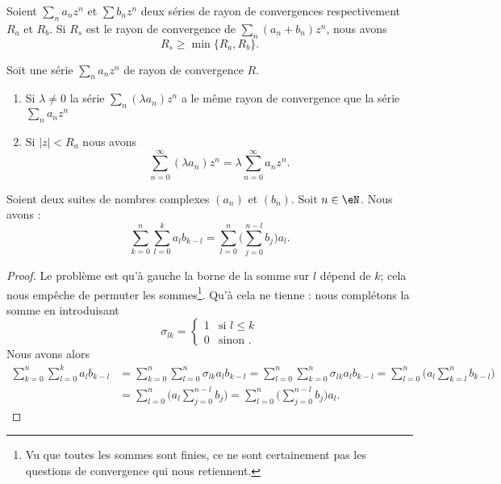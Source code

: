 \begin{theorem}\label{THOooSDQQooIawBOk}
	Soient \( \sum_na_nz^n\) et \( \sum b_nz^n\) deux séries de rayon de convergences respectivement \( R_a\) et \( R_b\).  Si \( R_s\) est le rayon de convergence de \( \sum_n(a_n+b_n)z^n\), nous avons
	\begin{equation}
		R_s\geq \min\{ R_a,R_b \}.
	\end{equation}
\end{theorem}

\begin{theorem}     \label{THOooINHDooZxErnp}
	Soit une série \( \sum_na_nz^n\) de rayon de convergence \( R\).
	\begin{enumerate}
		\item
		      Si \( \lambda\neq 0\) la série \( \sum_n(\lambda a_n)z^n\) a le même rayon de convergence que la série \( \sum_na_nz^n\)
		\item
		      Si \( | z |<R_a\) nous avons
		      \begin{equation}
			      \sum_{n=0}^{\infty}(\lambda a_n)z^n=\lambda\sum_{n=0}^{\infty}a_nz^n.
		      \end{equation}
	\end{enumerate}
\end{theorem}


\begin{lemma}       \label{LEMooNYAXooKUuQFe}
	Soient deux suites de nombres complexes \( (a_n)\) et \( (b_n)\). Soit \( n\in \eN\). Nous avons :
	\begin{equation}
		\sum_{k=0}^n\sum_{l=0}^ka_lb_{k-l}=\sum_{l=0}^n\big( \sum_{j=0}^{n-l}b_j \big)a_l.
	\end{equation}
\end{lemma}

\begin{proof}
	Le problème est qu'à gauche la borne de la somme sur \( l\) dépend de \( k\); cela nous empêche de permuter les sommes\footnote{Vu que toutes les sommes sont finies, ce ne sont certainement pas les questions de convergence qui nous retiennent.}. Qu'à cela ne tienne : nous complétons la somme en introduisant
	\begin{equation}
		\sigma_{lk}=\begin{cases}
			1 & \text{si } l\leq k \\
			0 & \text{sinon }.
		\end{cases}
	\end{equation}
	Nous avons alors
	\begin{subequations}
		\begin{align}
			\sum_{k=0}^n\sum_{l=0}^ka_lb_{k-l} & =\sum_{k=0}^n\sum_{l=0}^n\sigma_{lk}a_lb_{k-l}=\sum_{l=0}^n\sum_{k=0}^n\sigma_{lk}a_lb_{k-l} =\sum_{l=0}^n\big( a_l\sum_{k=l}^nb_{k-l} \big) \\
			                                   & =\sum_{l=0}^n\big( a_l\sum_{j=0}^{n-l}b_j \big)=\sum_{l=0}^n\big( \sum_{j=0}^{n-l}b_j \big)a_l.
		\end{align}
	\end{subequations}
\end{proof}

